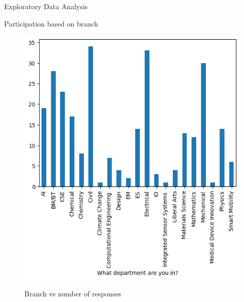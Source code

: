 \documentclass{beamer}
\begin{document}
\begin{frame}{Exploratory Data Analysis}
\begin{block}{Participation based on branch}
\begin{figure}
      \centering
    \caption{Branch vs number of responses}
    \includegraphics[scale = 0.38]{bar_department.png}  
    \label{fig:side-by-side}
\end{figure}
\end{block}
\end{frame}
\end{document}
